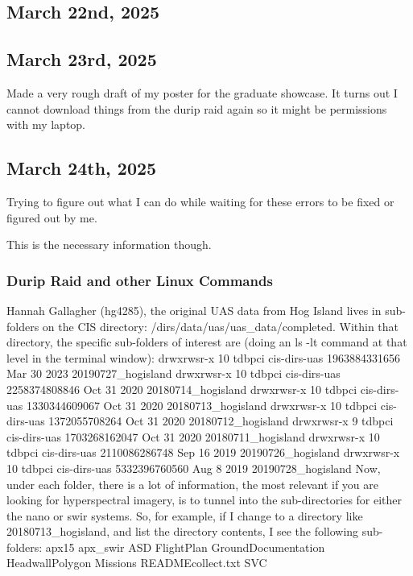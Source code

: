 \documentclass{article}
\begin{document}

\subsection{March 22nd, 2025}


\subsection{March 23rd, 2025}
Made a very rough draft of my poster for the graduate showcase. 
It turns out I cannot download things from the durip raid again so it might be permissions with my laptop. 

\subsection{March 24th, 2025}
Trying to figure out what I can do while waiting for these errors to be fixed or figured out by me. 

This is the necessary information though. 
\subsubsection{Durip Raid and other Linux Commands}
Hannah Gallagher (hg4285), the original UAS data from Hog Island lives in sub-folders on the CIS directory: /dirs/data/uas/uas_data/completed. Within that directory, the specific sub-folders of interest are (doing an ls -lt command at that level in the terminal window):
drwxrwsr-x 10 tdbpci cis-dirs-uas 1963884331656 Mar 30 2023 20190727_hogisland
drwxrwsr-x 10 tdbpci cis-dirs-uas 2258374808846 Oct 31 2020 20180714_hogisland
drwxrwsr-x 10 tdbpci cis-dirs-uas 1330344609067 Oct 31 2020 20180713_hogisland
drwxrwsr-x 10 tdbpci cis-dirs-uas 1372055708264 Oct 31 2020 20180712_hogisland
drwxrwsr-x 9 tdbpci cis-dirs-uas 1703268162047 Oct 31 2020 20180711_hogisland
drwxrwsr-x 10 tdbpci cis-dirs-uas 2110086286748 Sep 16 2019 20190726_hogisland
drwxrwsr-x 10 tdbpci cis-dirs-uas 5332396760560 Aug 8 2019 20190728_hogisland
Now, under each folder, there is a lot of information, the most relevant if you are looking for hyperspectral imagery, is to tunnel into the sub-directories for either the nano or swir systems. So, for example, if I change to a directory like 20180713_hogisland, and list the directory contents, I see the following sub-folders: apx15 apx_swir ASD FlightPlan GroundDocumentation HeadwallPolygon Missions READMEcollect.txt SVC
\end{document}
